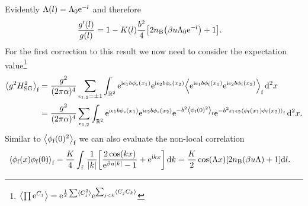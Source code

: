 \documentclass[english, parskip=full]{scrartcl}
\begin{document}
Evidently $\Lambda(l) = \Lambda_0\powe{-l}$ and therefore
\begin{align}
\frac{g'(l)}{g(l)} &= 1 - K(l)\frac{b^2}{4}\klb*{2n_\B\kla*{\beta u\Lambda_0\powe{-l}} + 1}.
\end{align}
For the first correction to this result we now need to consider the expectation value\footnote{$\bra*{\prod \powe{C_j}} = \powe{\frac{1}{2} \sum \bra{C_j^2}} \powe{\sum_{j<k} \bra*{C_jC_k}}$}
\begin{align}
\bra*{g^2 H_\text{SG}^2}_\f &= \frac{g^2}{(2\pi\alpha)^4} \sum_{\epsilon_{1,2}=\pm 1} \intrnd{2}{\powe{\i \epsilon_1 b\phi_\s(x_1)}\powe{\i \epsilon_2 b\phi_\s(x_2)} \bra*{\powe{\i \epsilon_1 b\phi_\f(x_1)}\powe{\i \epsilon_2 b\phi_\f(x_2)}}_\f }{x}\\
&= \frac{g^2}{(2\pi\alpha)^4} \sum_{\epsilon_{1,2}} \intrnd{2}{\powe{\i \epsilon_1 b\phi_\s(x_1)}\powe{\i \epsilon_2 b\phi_\s(x_2)} \powe{-b^2 \bra*{\phi_\f(0)^2}_\f} \powe{-b^2\epsilon_1\epsilon_2 \bra*{\phi_\f(x_1) \phi_\f(x_2)}_\f} }{x}.
\end{align}
Similar to $\bra*{\phi_\f(0)^2}_\f$ we can also evaluate the non-local correlation
\begin{align}
\bra*{\phi_\f(x) \phi_\f(0)}_\f &= \frac{K}{4} \intx{\f}{ }{\frac{1}{|k|} \klb*{\frac{2\cos(kx)}{\powe{\beta u|k|} - 1} + \powe{\i kx}}}{k} = \frac{K}{2} \cos(\Lambda x) \klb*{2n_\B(\beta u\Lambda) + 1} \d l.
\end{align}
\end{document}
